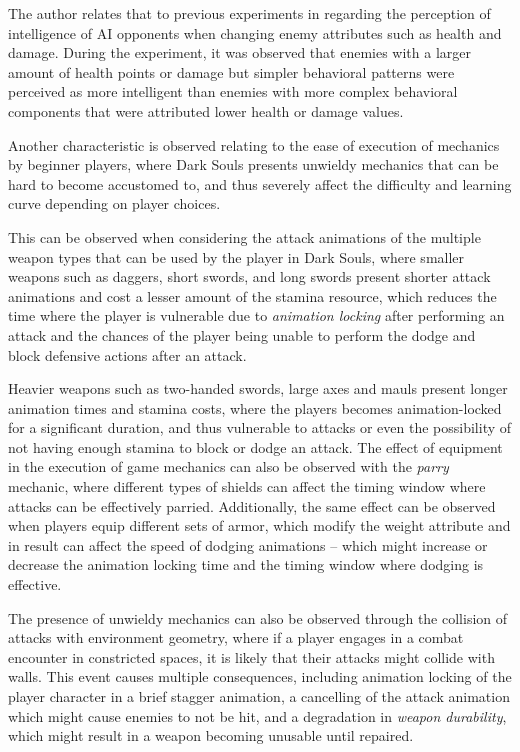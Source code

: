 The author relates that to previous experiments in \cite{URL_IllusionOfIntelligence} regarding the perception of intelligence of AI opponents when changing enemy attributes such as health and damage. During the experiment, it was observed that enemies with a larger amount of health points or damage but simpler behavioral patterns were perceived as more intelligent than enemies with more complex behavioral components that were attributed lower health or damage values.  

Another characteristic is observed relating to the ease of execution of mechanics by beginner players, where Dark Souls presents unwieldy mechanics that can be hard to become accustomed to, and thus severely affect the difficulty and learning curve depending on player choices.

This can be observed when considering the attack animations of the multiple weapon types that can be used by the player in Dark Souls, where smaller weapons such as daggers, short swords, and long swords present shorter attack animations and cost a lesser amount of the stamina resource, which reduces the time where the player is vulnerable due to \emph{animation locking} after performing an attack and the chances of the player being unable to perform the dodge and block defensive actions after an attack.

Heavier weapons such as two-handed swords, large axes and mauls present longer animation times and stamina costs, where the players becomes animation-locked for a significant duration, and thus vulnerable to attacks or even the possibility of not having enough stamina to block or dodge an attack. The effect of equipment in the execution of game mechanics can also be observed with the \emph{parry} mechanic, where different types of shields can affect the timing window where attacks can be effectively parried. Additionally, the same effect can be observed when players equip different sets of armor, which modify the weight attribute and in result can affect the speed of dodging animations -- which might increase or decrease the animation locking time and the timing window where dodging is effective.

The presence of unwieldy mechanics can also be observed through the collision of attacks with environment geometry, where if a player engages in a combat encounter in constricted spaces, it is likely that their attacks might collide with walls. This event causes multiple consequences, including animation locking of the player character in a brief stagger animation, a cancelling of the attack animation which might cause enemies to not be hit, and a degradation in \emph{weapon durability}, which might result in a weapon becoming unusable until repaired.

